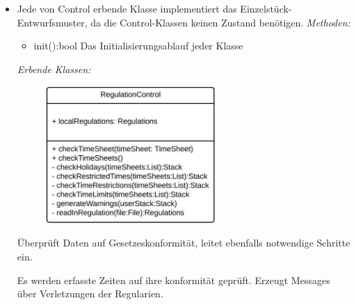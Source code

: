         \begin{itemize}
            \item Jede von Control erbende Klasse implementiert das Einzelstück-Entwurfsmuster, da die Control-Klassen keinen Zustand benötigen.
                \emph{Methoden:}
                \begin{itemize}
                    \item{init():bool}
                        Das Initialisierungsablauf jeder Klasse
                \end{itemize}
                \emph{Erbende Klassen:}
                \begin{itemize}
                    \begin{figure}[htb]
                    \centering
                    \includegraphics[width=6.5cm]{Diagramms/class/singleclass/ControlReg.pdf}
                    \end{figure}
                    \newline
                       Überprüft Daten auf Gesetzeskonformität, leitet ebenfalls notwendige Schritte ein.
                       \begin{itemize}
                            Es werden erfasste Zeiten auf ihre konformität geprüft.
                            Erzeugt Messages über Verletzungen der Regularien.
                       \end{itemize}


\end{itemize}
\end{itemize}
